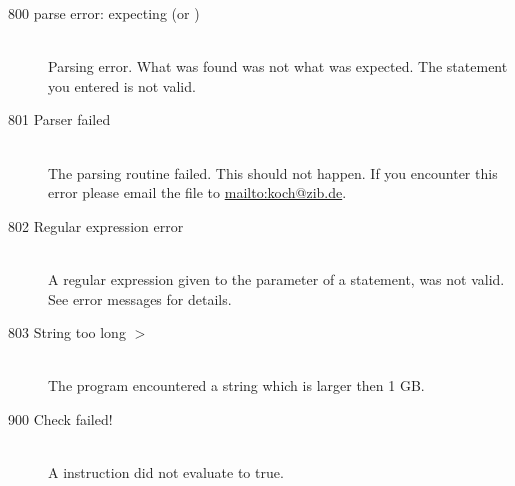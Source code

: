 \begin{description}
\item[800 parse error: expecting  (or )]\ \\
  Parsing error. What was found was not what was expected.
  The statement you entered is not valid.
\item[801 Parser failed]\ \\
  The parsing routine failed. This should not happen. If you encounter
  this error please email the  file to \url{mailto:koch@zib.de}.
\item[802 Regular expression error]\ \\
  A regular expression given to the  parameter of a
   statement, was not valid. See error messages for details.
\item[803 String too long  $>$ ]\ \\
  The program encountered a string which is larger then 1 GB. 
%
%
\item[900 Check failed!]\ \\
  A  instruction did not evaluate to true. 
\end{description}

